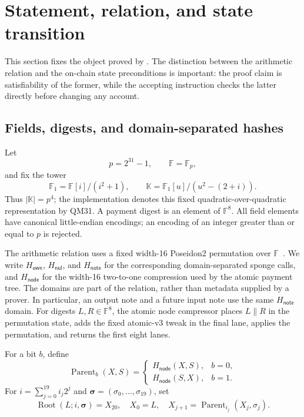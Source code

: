 \section{Statement, relation, and state transition}
\label{sec:relation}

This section fixes the object proved by \Profile{}.  The distinction between
the arithmetic relation and the on-chain state preconditions is important:
the proof claim is satisfiability of the former, while the
accepting instruction checks the latter directly before changing any account.

\subsection{Fields, digests, and domain-separated hashes}

Let
\[
  p=2^{31}-1,\qquad \mathbb F=\mathbb F_p,
\]
and fix the tower
\[
  \mathbb F_1=\mathbb F[i]/(i^2+1),\qquad
  \mathbb K=\mathbb F_1[u]/(u^2-(2+i)).
\]
Thus \(|\mathbb K|=p^4\); the implementation denotes this fixed
quadratic-over-quadratic representation by \textsf{QM31}.  A payment digest is an element of
\(\mathbb F^8\).  All field elements have canonical little-endian encodings;
an encoding of an integer greater than or equal to \(p\) is rejected.

The arithmetic relation uses a fixed width-16 Poseidon2 permutation over
\(\mathbb F\)~\cite{GrassiKhovratovichSchofnegger2023}.  We write
\(H_{\mathsf{own}}\), \(H_{\mathsf{nul}}\), and \(H_{\mathsf{note}}\) for
the corresponding domain-separated sponge calls, and
\(H_{\mathsf{node}}\) for the width-16 two-to-one compression used by the
atomic payment tree.  The domains are part of the relation, rather than
metadata supplied by a prover.  In particular, an output note and a future
input note use the same \(H_{\mathsf{note}}\) domain.  For digests
\(L,R\in\mathbb F^8\), the atomic node compressor places \(L\|R\) in the
permutation state, adds the fixed atomic-v3 tweak in the final lane, applies
the permutation, and returns the first eight lanes.

For a bit \(b\), define
\[
  \operatorname{Parent}_b(X,S)=
  \begin{cases}
     H_{\mathsf{node}}(X,S),&b=0,\\
     H_{\mathsf{node}}(S,X),&b=1.
  \end{cases}
\]
For \(i=\sum_{j=0}^{19}i_j2^j\) and
\(\boldsymbol\sigma=(\sigma_0,\ldots,\sigma_{19})\), set
\[
  \operatorname{Root}(L;i,\boldsymbol\sigma)
   =X_{20},\quad X_0=L,\quad
   X_{j+1}=\operatorname{Parent}_{i_j}(X_j,\sigma_j).
\]

